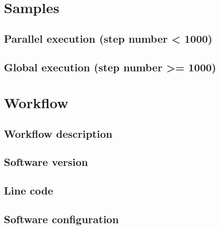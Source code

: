 \documentclass[a4paper]{article}
\begin{document}


\section{Samples}

\subsection{Parallel execution (step number < 1000)}



\subsection{Global execution (step number >= 1000)}


\section{Workflow}

\subsection{Workflow description}


\subsection{Software version}


 

\subsection{Line code}




\subsection{Software configuration}
\end{document}

